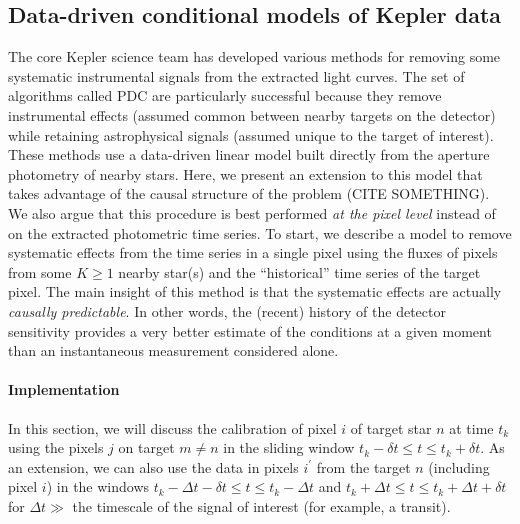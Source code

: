 \documentclass[letterpaper,12pt,preprint]{aastex}
\begin{document}
\subsection{Data-driven conditional models of Kepler data}

The core Kepler science team has developed various methods for removing some
systematic instrumental signals from the extracted light curves.
The set of algorithms called PDC \citep{map-pdc1,map-pdc2} are particularly
successful because they remove instrumental effects (assumed common between
nearby targets on the detector) while retaining astrophysical signals (assumed
unique to the target of interest).
These methods use a data-driven linear model built directly from the aperture
photometry of nearby stars.
Here, we present an extension to this model that takes advantage of the causal
structure of the problem (CITE SOMETHING).
We also argue that this procedure is best performed \emph{at the pixel level}
instead of on the extracted photometric time series.
To start, we describe a model to remove systematic effects from the time
series in a single pixel using the fluxes of pixels from some $K\ge1$ nearby
star(s) and the ``historical'' time series of the target pixel.
The main insight of this method is that the systematic effects are actually
\emph{causally predictable}.
In other words, the (recent) history of the detector sensitivity provides a
very better estimate of the conditions at a given moment than an
instantaneous measurement considered alone.

\paragraph{Implementation}
In this section,
we will discuss the calibration of pixel $i$ of target star $n$ at time $t_k$
using the pixels $j$ on target $m \ne n$ in the sliding window $t_k - \delta t
\le t \le t_k + \delta t$.
As an extension, we can also use the data in pixels $i^\prime$ from the target
$n$ (including pixel $i$) in the windows $t_k - \Delta t - \delta t \le t \le
t_k - \Delta t$ and $t_k + \Delta t \le t \le t_k + \Delta t + \delta t $ for
$\Delta t \gg $ the timescale of the signal of interest (for example, a
transit).
\end{document}
